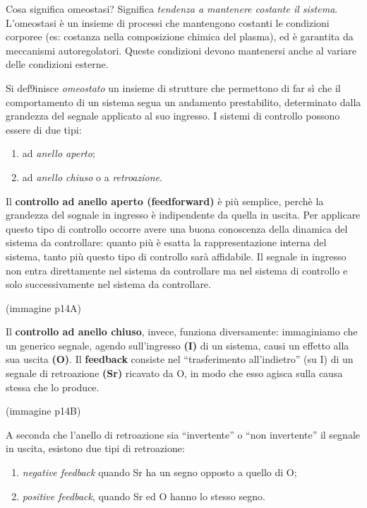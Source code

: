 \documentclass[]{article}
\begin{document}
Cosa significa omeostasi? Significa \emph{tendenza a mantenere costante
il sistema}. L'omeostasi è un insieme di processi che mantengono
costanti le condizioni corporee (es: costanza nella composizione chimica
del plasma), ed è garantita da meccanismi autoregolatori. Queste
condizioni devono mantenersi anche al variare delle condizioni esterne.

Si def9inisce \emph{omeostato} un insieme di strutture che permettono di
far sì che il comportamento di un sistema segua un andamento
prestabilito, determinato dalla grandezza del segnale applicato al suo
ingresso. I sistemi di controllo possono essere di due tipi:

\begin{enumerate}
\def\labelenumi{\arabic{enumi}.}
\itemsep1pt\parskip0pt
\item
  ad \emph{anello aperto};
\item
  ad \emph{anello chiuso} o a \emph{retroazione}.
\end{enumerate}

Il \textbf{controllo ad anello aperto (feedforward)} è più semplice,
perchè la grandezza del sognale in ingresso è indipendente da quella in
uscita. Per applicare questo tipo di controllo occorre avere una buona
conoscenza della dinamica del sistema da controllare: quanto più è
esatta la rappresentazione interna del sistema, tanto più questo tipo di
controllo sarà affidabile. Il segnale in ingresso non entra direttamente
nel sistema da controllare ma nel sistema di controllo e solo
successivamente nel sistema da controllare.

(immagine p14A)

Il \textbf{controllo ad anello chiuso}, invece, funziona diversamente:
immaginiamo che un generico segnale, agendo sull'ingresso \textbf{(I)}
di un sistema, causi un effetto alla sua uscita \textbf{(O)}. Il
\textbf{feedback} consiste nel ``trasferimento all'indietro'' (su I) di
un segnale di retroazione \textbf{(Sr)} ricavato da O, in modo che esso
agisca sulla causa stessa che lo produce.

(immagine p14B)

A seconda che l'anello di retroazione sia ``invertente'' o ``non
invertente'' il segnale in uscita, esistono due tipi di retroazione:

\begin{enumerate}
\def\labelenumi{\arabic{enumi}.}
\itemsep1pt\parskip0pt
\item
  \emph{negative feedback} quando Sr ha un segno opposto a quello di O;
\item
  \emph{positive feedback}, quando Sr ed O hanno lo stesso segno.
\end{enumerate}
\end{document}
